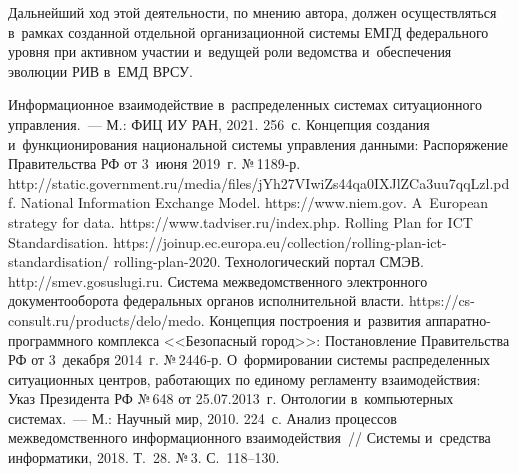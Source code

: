 \begin{multicols}{2}
Дальнейший ход этой деятельности, по мнению автора, должен 
осуществляться в~рамках созданной отдельной организационной сис\-те\-мы 
ЕМГД федерального уров\-ня при активном учас\-тии и~ведущей роли 
ведомства и~обеспечения эволюции РИВ в~ЕМД ВРСУ.

\vspace*{-6pt}

{\small\frenchspacing
 {\baselineskip=11.5pt
 \begin{thebibliography}{99}
 
 \vspace*{-2pt}
 
 Информационное взаимодействие 
в~распределенных сис\-те\-мах ситуационного управ\-ле\-ния.~--- М.: ФИЦ ИУ 
РАН, 2021. 256~с. 
Концепция создания и~функционирования национальной сис\-те\-мы 
управ\-ле\-ния данными: Распоряжение Правительства РФ от 3~июня 2019~г. №\,1189-р.
{\sf 
http://static.government.ru/media/files/jYh27VIwiZs4\linebreak 4qa0IXJlZCa3uu7qqLzl.pdf}.
National Information Exchange Model. {\sf https://www.\linebreak niem.gov}.
A~European strategy for data. {\sf https://www.tadviser.ru/\linebreak index.php}.
Rolling Plan for ICT Standardisation. {\sf  
https://joinup.ec.\linebreak europa.eu/collection/rolling-plan-ict-standardisation/ rolling-plan-2020}.
Технологический портал СМЭВ. {\sf http://smev.\linebreak gosuslugi.ru}.
Система межведомственного электронного документооборота федеральных органов исполнительной влас\-ти. {\sf https://cs-consult.ru/products/delo/medo}.
Концепция построения и~развития ап\-па\-рат\-но-про\-грам\-мно\-го 
комплекса <<Безопас\-ный город>>: Постановление Правительства РФ от 3~декабря 2014~г.  
№\,2446-р.
О~формировании сис\-те\-мы распределенных ситуационных цент\-ров,  
ра\-бо\-та\-ющих по единому регламенту взаимодействия: Указ Президента 
РФ №\,648 от 25.07.2013~г.
\vspace*{-1pt}
 Онтологии в~компьютерных сис\-те\-мах.~--- М.: 
Научный мир, 2010. 224~с.
 Анализ процессов межведомственного информационного 
взаимодействия~// Сис\-те\-мы и~средства информатики, 2018. Т.~28. №\,3. 
С.~118--130.
\end{thebibliography}

 }
 }

\end{multicols}

